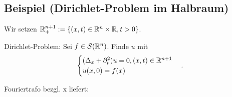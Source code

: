 \subsection{Beispiel (Dirichlet-Problem im Halbraum)}

Wir setzen $\mathbb{R}_+^{n+1} := \{ (x,t) \in \mathbb{R}^n \times \mathbb{R}, t > 0\}$.

Dirichlet-Problem: Sei $f \in \mathcal{S}(\mathbb{R}^n)$. Finde $u$ mit 
$$\begin{cases} (\Delta_x + \partial_t^2)u = 0, (x,t) \in \mathbb{R}^{n+1} \\ u(x,0) = f(x) \end{cases}.$$

Fouriertrafo bezgl. x liefert: 
